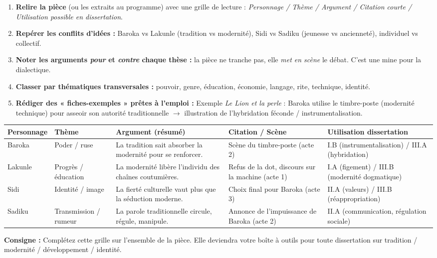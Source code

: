 \documentclass[11pt]{article}
\begin{document}
\begin{methode}
\begin{enumerate}
\item \textbf{Relire la pièce} (ou les extraits au programme) avec une grille de lecture : \emph{Personnage / Thème / Argument / Citation courte / Utilisation possible en dissertation}.
\item \textbf{Repérer les conflits d'idées :} Baroka vs Lakunle (tradition vs modernité), Sidi vs Sadiku (jeunesse vs ancienneté), individuel vs collectif.
\item \textbf{Noter les arguments \emph{pour} et \emph{contre} chaque thèse :} la pièce ne tranche pas, elle \emph{met en scène} le débat. C'est une mine pour la dialectique.
\item \textbf{Classer par thématiques transversales :} pouvoir, genre, éducation, économie, langage, rite, technique, identité.
\item \textbf{Rédiger des « fiches-exemples » prêtes à l'emploi :} \og Exemple \emph{Le Lion et la perle} : Baroka utilise le timbre-poste (modernité technique) pour asseoir son autorité traditionnelle $\rightarrow$ illustration de l'hybridation féconde / instrumentalisation. \fg
\end{enumerate}
\end{methode}

\begin{exemplebox}
\begin{center}
\begin{tabularx}{\linewidth}{|l|l|X|l|X|}\hline
\textbf{Personnage} & \textbf{Thème} & \textbf{Argument (résumé)} & \textbf{Citation / Scène} & \textbf{Utilisation dissertation} \\ \hline
Baroka & Poder / ruse & La tradition sait absorber la modernité pour se renforcer. & Scène du timbre-poste (acte 2) & I.B (instrumentalisation) / III.A (hybridation) \\ \hline
Lakunle & Progrès / éducation & La modernité libère l'individu des chaînes coutumières. & Refus de la dot, discours sur la machine (acte 1) & I.A (figement) / III.B (modernité dogmatique) \\ \hline
Sidi & Identité / image & La fierté culturelle vaut plus que la séduction moderne. & Choix final pour Baroka (acte 3) & II.A (valeurs) / III.B (réappropriation) \\ \hline
Sadiku & Transmission / rumeur & La parole traditionnelle circule, régule, manipule. & Annonce de l'impuissance de Baroka (acte 2) & II.A (communication, régulation sociale) \\ \hline
\end{tabularx}
\end{center}
\textbf{Consigne :} Complétez cette grille sur l'ensemble de la pièce. Elle deviendra votre \og boîte à outils \fg pour toute dissertation sur tradition / modernité / développement / identité.
\end{exemplebox}
\end{document}
